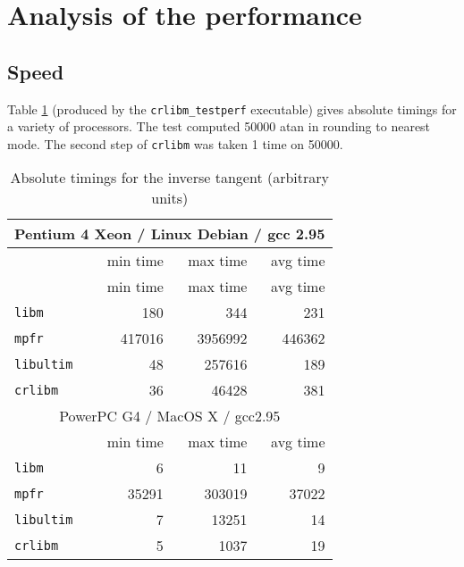 \section{Analysis of the performance}

\subsection{Speed}
Table \ref{tbl:arctan_abstime} (produced by the \texttt{crlibm\_testperf}
executable) gives absolute timings for a variety of processors. The test
computed 50000 atan in rounding to nearest mode. The second step of
\texttt{crlibm} was taken 1 time on 50000.

\begin{table}[!htb]
\begin{center}
\renewcommand{\arraystretch}{1.2}
\begin{tabular}{|l|r|r|r|}
\hline
\hline

 \multicolumn{4}{|c|}{Pentium 4 Xeon / Linux Debian / gcc 2.95}   \\
 \hline
                         & min time      & max time      & avg time \\ 
 \hline
                         & min time      & max time      & avg time \\ 
 \hline
 \texttt{libm}           & 180          & 344           &        231 \\ 
 \hline
  \texttt{mpfr}          & 417016       & 3956992       &     446362 \\ 
 \hline
  \texttt{libultim}      & 48           & 257616        &        189 \\ 
 \hline
 \texttt{crlibm}         & 36           & 46428         &        381 \\ 
 \hline
 \hline
  \multicolumn{4}{|c|}{PowerPC G4 / MacOS X / gcc2.95}   \\
 \hline
                         & min time      & max time      & avg time \\
 \hline
 \texttt{libm}           & 6            & 11            &          9 \\
 \hline
  \texttt{mpfr}          & 35291        & 303019        &      37022 \\
 \hline
  \texttt{libultim}      & 7            & 13251         &         14 \\
 \hline
 \texttt{crlibm}         & 5            & 1037          &         19 \\
 \hline
 \hline

\end{tabular}
\end{center}
\caption{Absolute timings for the inverse tangent (arbitrary units)
  \label{tbl:arctan_abstime}}
\end{table}

